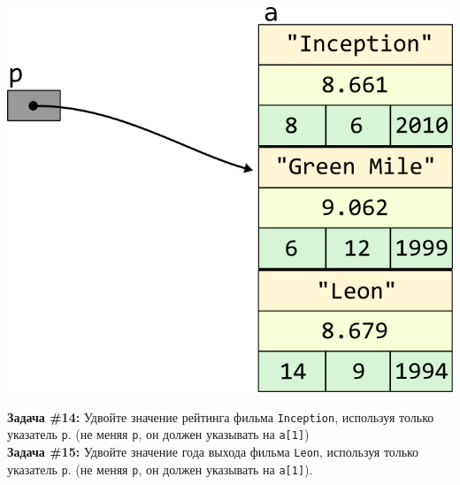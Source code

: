 \documentclass{article}
\begin{document}
\vspace{-59ex}
\begin{center}
\quad\quad\quad\quad\quad\quad\quad\quad\quad\quad\quad\quad\quad\quad\quad\quad\quad\quad\quad\quad\quad\quad\quad
\includegraphics[scale=1]{../images/pointer_schemes/pointer_to_array_of_struct_movie.png}
\end{center}
\textbf{Задача \#14:} Удвойте значение рейтинга фильма \texttt{Inception}, используя только указатель \texttt{p}. (не меняя \texttt{p}, он должен указывать на \texttt{a[1]})\\
\textbf{Задача \#15:} Удвойте значение года выхода фильма \texttt{Leon}, используя только указатель \texttt{p}. (не меняя \texttt{p}, он должен указывать на \texttt{a[1]}).\\
\end{document}
